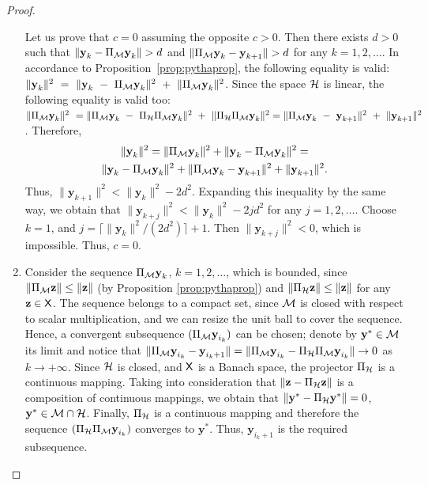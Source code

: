 \documentclass[sii]{ipart}
\newcommand{\bfy}{\textbf{y}}
\newcommand{\bfz}{\textbf{z}}
\begin{document}
\begin{proof}
\begin{enumerate}
		Let us prove that $c = 0$ assuming the opposite $c > 0$. Then there exists $d > 0$ such that $\|\bfy_k - \Pi_{\calM} \bfy_k\| > d$ and $\|\Pi_{\calM} \bfy_k - \bfy_{k + 1}\| > d$ for any $k = 1, 2, \ldots$. In accordance to Proposition~\ref{prop:pythaprop}, the following equality is valid: $\|\bfy_k \|^2~=~\|\bfy_k~-~\Pi_{\calM} \bfy_k\|^2~+~\|\Pi_{\calM} \bfy_k \|^2$. Since the space $\mathcal{H}$ is linear, the following equality is valid too:
		$\|\Pi_{\calM} \bfy_k \|^2~=\|\Pi_{\calM} \bfy_k~-~\Pi_\calH \Pi_{\calM} \bfy_k\|^2~+~\|\Pi_\calH \Pi_{\calM} \bfy_k \|^2 = \|\Pi_{\calM} \bfy_k~-~\bfy_{k+1}\|^2~+~\|\bfy_{k+1} \|^2$. Therefore,
		\begin{multline*}
		\|\bfy_k\|^2 = \|\Pi_{\calM} \bfy_k\|^2 + \|\bfy_k - \Pi_{\calM} \bfy_k\|^2 =\\ \|\bfy_k - \Pi_{\calM} \bfy_k\|^2 + \|\Pi_{\calM} \bfy_k - \bfy_{k + 1}\|^2 + \|\bfy_{k + 1}\|^2.
		\end{multline*}
		Thus, $\|\bfy_{k+1}\|^2 < \|\bfy_k\|^2 - 2d^2$. Expanding this inequality by the same way, we obtain that $\|\bfy_{k+j}\|^2 < \|\bfy_k\|^2 - 2 j d^2$ for any $j = 1, 2, \ldots$. Choose $k = 1$, and $j = \lceil \|\bfy_k\|^2 / (2d^2) \rceil + 1$. Then $\|\bfy_{k+j}\|^2 < 0$, which is impossible. Thus, $c=0$.
		\item Consider the sequence $\Pi_{\calM} \bfy_k$, $k = 1, 2, \ldots$, which is bounded, since $\|\Pi_{\calM} \bfz\| \le \|\bfz\|$ (by Proposition \ref{prop:pythaprop}) and $\|\Pi_{\calH} \bfz\| \le \|\bfz\|$ for any $\bfz \in \sfX$. The sequence belongs to a compact set, since $\mathcal{M}$ is closed with respect to scalar multiplication, and we can resize the unit ball to cover the sequence. Hence, a convergent subsequence $(\Pi_{\calM} \bfy_{i_k})$ can be chosen; denote by $\bfy^*\in\calM$ its limit and notice that $\|\Pi_{\calM} \bfy_{i_k} - \bfy_{i_k + 1}\| = \|\Pi_{\calM} \bfy_{i_k} - \Pi_\calH \Pi_{\calM} \bfy_{i_k}\| \to 0$ as $k \to + \infty$. Since  $\mathcal{H}$ is closed, and $\mathsf{X}$ is a Banach space, the projector $\Pi_{\mathcal{H}}$ is a continuous mapping. Taking into consideration that $\|\bfz - \Pi_\calH \bfz\|$ is a composition of continuous mappings, we obtain that $\|\bfy^* - \Pi_\calH \bfy^*\| = 0$, $\bfy^* \in \calM \cap \calH$. Finally, $\Pi_{\mathcal{H}}$ is a continuous mapping and therefore the sequence $(\Pi_\calH \Pi_{\calM} \bfy_{i_k})$ converges to $\bfy^*$. Thus, $\bfy_{i_k + 1}$ is the required subsequence.
	\end{enumerate}
\end{proof}
\end{document}
